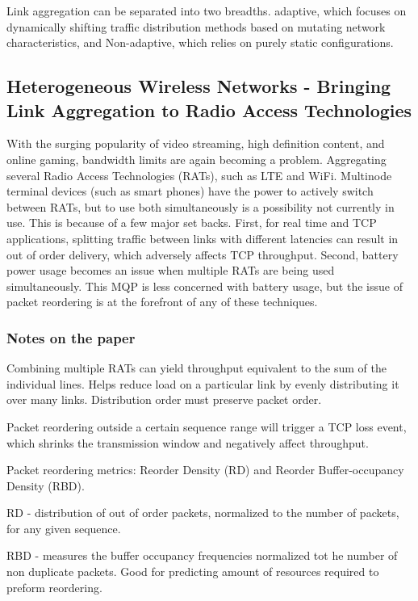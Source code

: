 \documentclass{article}
\begin{document}
Link aggregation can be separated into two breadths. adaptive, which focuses on dynamically shifting traffic distribution methods based on mutating network characteristics, and Non-adaptive, which relies on purely static configurations.


\subsection{Heterogeneous Wireless Networks - Bringing Link Aggregation to Radio Access Technologies}

With the surging popularity of video streaming, high definition content, and online gaming, bandwidth limits are again becoming a problem. Aggregating several Radio Access Technologies (RATs), such as LTE and WiFi. Multinode terminal devices (such as smart phones) have the power to actively switch between RATs, but to use both simultaneously is a possibility not currently in use. This is because of a few major set backs. First, for real time and TCP applications, splitting traffic between links with different latencies can result in out of order delivery, which adversely affects TCP throughput. Second, battery power usage becomes an issue when multiple RATs are being used simultaneously. This MQP is less concerned with battery usage, but the issue of packet reordering is at the forefront of any of these techniques. 

\subsubsection{Notes on the paper}

Combining multiple RATs can yield throughput equivalent to the sum of the individual lines. Helps reduce load on a particular link by evenly distributing it over many links. Distribution order must preserve packet order. 

Packet reordering outside a certain sequence range will trigger a TCP loss event, which shrinks the transmission window and negatively affect throughput.

Packet reordering metrics: Reorder Density (RD) and Reorder Buffer-occupancy Density (RBD). 

RD - distribution of out of order packets, normalized to the number of packets, for any given sequence.

RBD - measures the buffer occupancy frequencies normalized tot he number of non duplicate packets. Good for predicting amount of resources required to preform reordering.
\end{document}
